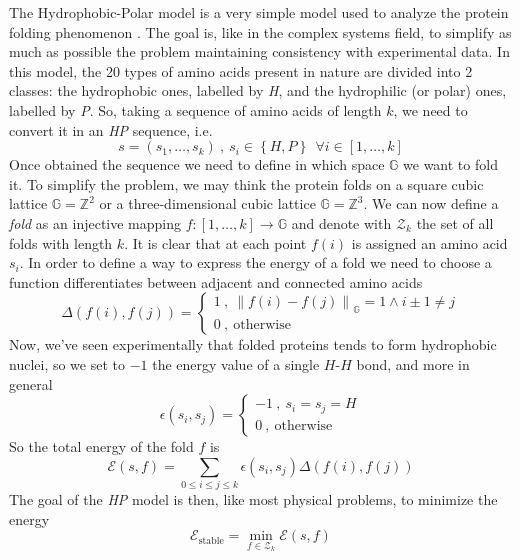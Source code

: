 The Hydrophobic-Polar model is a very simple model used to analyze the protein folding phenomenon \cite{PERM}.
The goal is, like in the complex systems field, to simplify as much as possible the problem maintaining consistency with experimental data.
In this model, the 20 types of amino acids present in nature are divided into 2 classes: the hydrophobic ones, labelled by \emph{H}, and the hydrophilic (or polar) ones, labelled by \emph{P}.
So, taking a sequence of amino acids of length $k$, we need to convert it in an \emph{HP} sequence, i.e.
\begin{equation*}
    s = \left(s_1, \ldots, s_k\right) \ , \ s_i \in \left\{H, P\right\} \ \ \forall i \in \left[1,\ldots,k\right]
\end{equation*}
Once obtained the sequence we need to define in which space $\mathbb{G}$ we want to fold it.
To simplify the problem, we may think the protein folds on a square cubic lattice $\mathbb{G} = \mathbb{Z}^2$ or a three-dimensional cubic lattice $\mathbb{G} = \mathbb{Z}^3$.
We can now define a \emph{fold} as an injective mapping $f : \left[1,\ldots,k\right] \to \mathbb{G}$ and denote with $\mathcal{Z}_k$ the set of all folds with length $k$.
It is clear that at each point $f(i)$ is assigned an amino acid $s_i$.
In order to define a way to express the energy of a fold we need to choose a function differentiates between adjacent and connected amino acids
\begin{equation*}
    \Delta\left(f(i),f(j)\right) =
    \begin{cases}
        1 \ , \ {\left\lVert f(i) - f(j) \right\rVert}_\mathbb{G} = 1 \land i \pm 1 \neq j\\
        0 \ , \ \text{otherwise}
    \end{cases}
\end{equation*}
Now, we've seen experimentally that folded proteins tends to form hydrophobic nuclei, so we set to $-1$ the energy value of a single $H$-$H$ bond, and more in general
\begin{equation*}
    \epsilon\left(s_i,s_j\right) =
    \begin{cases}
        -1 \ , \ s_i = s_j = H\\
        0 \ , \ \text{otherwise}
    \end{cases}
\end{equation*}
So the total energy of the fold $f$ is
\begin{equation*}
    \mathcal{E}(s,f) = \sum_{0 \leq i \leq j \leq k} \epsilon\left(s_i,s_j\right)\Delta\left(f(i),f(j)\right)
\end{equation*}
The goal of the \emph{HP} model is then, like most physical problems, to minimize the energy
\begin{equation*}
    \mathcal{E}_\text{stable} = \min_{f \in \mathcal{Z}_k} \mathcal{E}(s,f)
\end{equation*}
